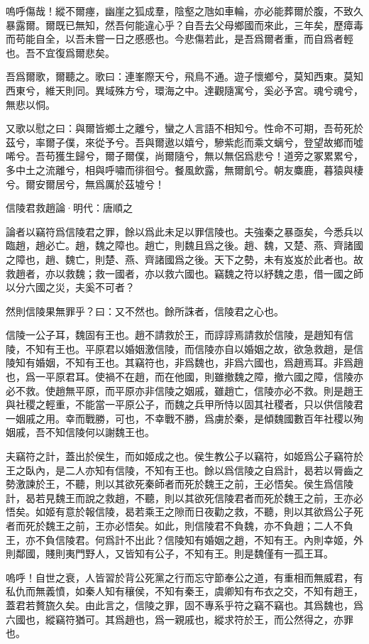 \documentclass[12pt,a4paper]{ctexbook}
\begin{document}
嗚呼傷哉！縱不爾瘞，幽崖之狐成羣，陰壑之虺如車輪，亦必能葬爾於腹，不致久暴露爾。爾既已無知，然吾何能違心乎？自吾去父母鄉國而來此，三年矣，歷瘴毒而苟能自全，以吾未嘗一日之慼慼也。今悲傷若此，是吾爲爾者重，而自爲者輕也。吾不宜復爲爾悲矣。\par
吾爲爾歌，爾聽之。歌曰：連峯際天兮，飛鳥不通。遊子懷鄉兮，莫知西東。莫知西東兮，維天則同。異域殊方兮，環海之中。達觀隨寓兮，奚必予宮。魂兮魂兮，無悲以恫。\par
又歌以慰之曰：與爾皆鄉土之離兮，蠻之人言語不相知兮。性命不可期，吾苟死於茲兮，率爾子僕，來從予兮。吾與爾遨以嬉兮，驂紫彪而乘文螭兮，登望故鄉而噓唏兮。吾苟獲生歸兮，爾子爾僕，尚爾隨兮，無以無侶爲悲兮！道旁之冢累累兮，多中土之流離兮，相與呼嘯而徘徊兮。餐風飲露，無爾飢兮。朝友麋鹿，暮猿與棲兮。爾安爾居兮，無爲厲於茲墟兮！\par
信陵君救趙論·明代：唐順之 \par
論者以竊符爲信陵君之罪，餘以爲此未足以罪信陵也。夫強秦之暴亟矣，今悉兵以臨趙，趙必亡。趙，魏之障也。趙亡，則魏且爲之後。趙、魏，又楚、燕、齊諸國之障也，趙、魏亡，則楚、燕、齊諸國爲之後。天下之勢，未有岌岌於此者也。故救趙者，亦以救魏；救一國者，亦以救六國也。竊魏之符以紓魏之患，借一國之師以分六國之災，夫奚不可者？\par
然則信陵果無罪乎？曰：又不然也。餘所誅者，信陵君之心也。\par
信陵一公子耳，魏固有王也。趙不請救於王，而諄諄焉請救於信陵，是趙知有信陵，不知有王也。平原君以婚姻激信陵，而信陵亦自以婚姻之故，欲急救趙，是信陵知有婚姻，不知有王也。其竊符也，非爲魏也，非爲六國也，爲趙焉耳。非爲趙也，爲一平原君耳。使禍不在趙，而在他國，則雖撤魏之障，撤六國之障，信陵亦必不救。使趙無平原，而平原亦非信陵之姻戚，雖趙亡，信陵亦必不救。則是趙王與社稷之輕重，不能當一平原公子，而魏之兵甲所恃以固其社稷者，只以供信陵君一姻戚之用。幸而戰勝，可也，不幸戰不勝，爲虜於秦，是傾魏國數百年社稷以殉姻戚，吾不知信陵何以謝魏王也。\par
夫竊符之計，蓋出於侯生，而如姬成之也。侯生教公子以竊符，如姬爲公子竊符於王之臥內，是二人亦知有信陵，不知有王也。餘以爲信陵之自爲計，曷若以脣齒之勢激諫於王，不聽，則以其欲死秦師者而死於魏王之前，王必悟矣。侯生爲信陵計，曷若見魏王而說之救趙，不聽，則以其欲死信陵君者而死於魏王之前，王亦必悟矣。如姬有意於報信陵，曷若乘王之隙而日夜勸之救，不聽，則以其欲爲公子死者而死於魏王之前，王亦必悟矣。如此，則信陵君不負魏，亦不負趙；二人不負王，亦不負信陵君。何爲計不出此？信陵知有婚姻之趙，不知有王。內則幸姬，外則鄰國，賤則夷門野人，又皆知有公子，不知有王。則是魏僅有一孤王耳。\par
嗚呼！自世之衰，人皆習於背公死黨之行而忘守節奉公之道，有重相而無威君，有私仇而無義憤，如秦人知有穰侯，不知有秦王，虞卿知有布衣之交，不知有趙王，蓋君若贅旒久矣。由此言之，信陵之罪，固不專系乎符之竊不竊也。其爲魏也，爲六國也，縱竊符猶可。其爲趙也，爲一親戚也，縱求符於王，而公然得之，亦罪也。\par
\end{document}
